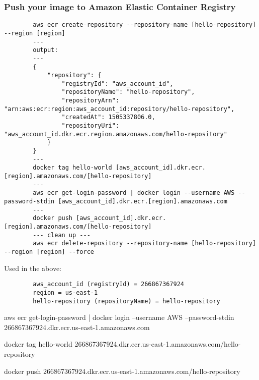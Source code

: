 \documentclass[11pt]{article}
\begin{document}
    \subsubsection*{Push your image to Amazon Elastic Container Registry}
    \begin{lstlisting}
        aws ecr create-repository --repository-name [hello-repository] --region [region]
        ---
        output:
        ---
        {
            "repository": {
                "registryId": "aws_account_id",
                "repositoryName": "hello-repository",
                "repositoryArn": "arn:aws:ecr:region:aws_account_id:repository/hello-repository",
                "createdAt": 1505337806.0,
                "repositoryUri": "aws_account_id.dkr.ecr.region.amazonaws.com/hello-repository"
            }
        }
        ---
        docker tag hello-world [aws_account_id].dkr.ecr.[region].amazonaws.com/[hello-repository]
        ---
        aws ecr get-login-password | docker login --username AWS --password-stdin [aws_account_id].dkr.ecr.[region].amazonaws.com
        ---
        docker push [aws_account_id].dkr.ecr.[region].amazonaws.com/[hello-repository]
        --- clean up ---
        aws ecr delete-repository --repository-name [hello-repository] --region [region] --force
    \end{lstlisting}
    Used in the above:
    \begin{lstlisting}
        aws_account_id (registryId) = 266867367924
        region = us-east-1
        hello-repository (repositoryName) = hello-repository
    \end{lstlisting}

    aws ecr get-login-password | docker login --username AWS --password-stdin 266867367924.dkr.ecr.us-east-1.amazonaws.com

    docker tag hello-world 266867367924.dkr.ecr.us-east-1.amazonaws.com/hello-repository

    docker push 266867367924.dkr.ecr.us-east-1.amazonaws.com/hello-repository
\end{document}
